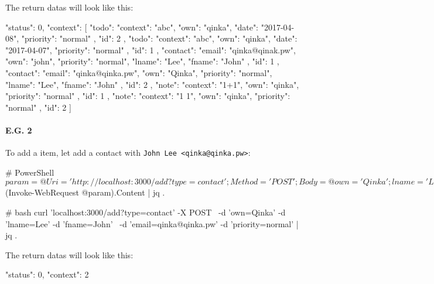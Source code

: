 \documentclass{article}
\begin{document}
  The return datas will look like this:
  \begin{json}
{
    "status": 0,
    "context": [
    {
        "todo": {
            "context": "abc",
            "own": "qinka",
            "date": "2017-04-08",
            "priority": "normal"
        },
        "id": 2
    },
    {
        "todo": {
            "context": "abc",
            "own": "qinka",
            "date": "2017-04-07",
            "priority": "normal"
        },
        "id": 1
    },
    {
        "contact": {
            "email": "qinka@qinak.pw",
            "own": "john",
            "priority": "normal",
            "lname": "Lee",
            "fname": "John"
        },
        "id": 1
    },
    {
        "contact": {
            "email": "qinka@qinka.pw",
            "own": "Qinka",
            "priority": "normal",
            "lname": "Lee",
            "fname": "John"
        },
        "id": 2
    },
    {
        "note": {
            "context": "1+1",
            "own": "qinka",
            "priority": "normal"
        },
        "id": 1
    },
    {
        "note": {
            "context": "1 1",
            "own": "qinka",
            "priority": "normal"
        },
        "id": 2
    }
    ]
}
  \end{json}
  
  \paragraph{E.G. 2}
  
  To add a item, let add a contact with \verb|John Lee <qinka@qinka.pw>|:
  \begin{powershell}
 # PowerShell
 $param = @{ Uri = 'http://localhost:3000/add?type=contact';
             Method = 'POST';
             Body = @{ own = 'Qinka';
                       lname = 'Lee';
                       fname = 'John';
                       email = 'qinka@qinka.pw';
                       priority = 'normal'
                     }
           }
 $(Invoke-WebRequest @param).Content | jq .
  \end{powershell}
  \begin{bash}
 # bash
 curl 'localhost:3000/add?type=contact' -X POST \
   -d 'own=Qinka' -d 'lname=Lee' -d 'fname=John' \
   -d 'email=qinka@qinka.pw' -d 'priority=normal' | jq .
  \end{bash}
  
  The return datas will look like this:
  \begin{json}
 {
     "status": 0,
     "context": 2
 }
  \end{json}
  
\end{document}
